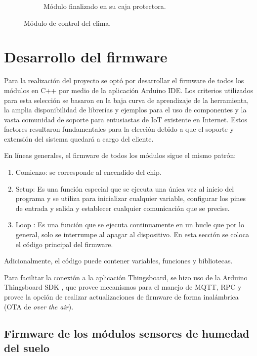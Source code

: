 \begin{figure}[!htpb]
\begin{subfigure}[b]{0.45\textwidth}
		\caption{Módulo finalizado en su caja protectora.}
		\label{fig:vent3}
     \end{subfigure}
     \hfill
        \caption[Módulo de control del clima]{Módulo de control del clima.}
        \label{fig:ventcontrol}
\end{figure}


\pagebreak

\section{Desarrollo del firmware}
\label{sec:Desarrollo del firmware}

Para la realización del proyecto se optó por desarrollar el firmware de todos los módulos en C++ por medio de la aplicación Arduino IDE. Los criterios utilizados para esta selección se basaron en la baja curva de aprendizaje de la herramienta, la amplia disponibilidad de librerías y ejemplos para el uso de componentes y la vasta comunidad de soporte para entusiastas de IoT existente en Internet.  Estos factores resultaron fundamentales para la elección debido a que el soporte y extensión del sistema quedará a cargo del cliente.

En líneas generales, el firmware de todos los módulos sigue el mismo patrón:

\begin{enumerate}
\item Comienzo: se corresponde al encendido del chip.
\item Setup: Es una función especial que se ejecuta una única vez al inicio del programa y se utiliza para inicializar cualquier variable, configurar los pines de entrada y salida y establecer cualquier comunicación que se precise.

\item Loop : Es una función que se ejecuta continuamente en un bucle que por lo general, solo se interrumpe al apagar al dispositivo. En esta sección se coloca el código principal del firmware.
\end{enumerate}
Adicionalmente, el código puede contener variables, funciones y bibliotecas.


Para facilitar la conexión a la aplicación Thingsboard, se hizo uso de la Arduino Thingsboard SDK \citep{tbsdk}, que provee mecanismos para el manejo de MQTT, RPC y provee la opción de realizar actualizaciones de firmware de forma inalámbrica (OTA de \textit{over the air}). 




\subsection{Firmware de los módulos sensores de humedad del suelo}
\label{Firmware de los módulos sensores de humedad del suelo}

